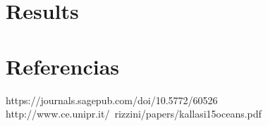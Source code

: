 \documentclass[12pt, a4paper]{article}
\begin{document}


\section{Results}\label{ch:results}

\section{Referencias}

https://journals.sagepub.com/doi/10.5772/60526
http://www.ce.unipr.it/~rizzini/papers/kallasi15oceans.pdf
\end{document}
